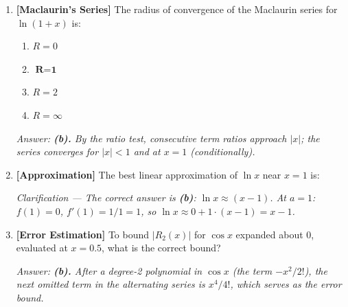 \documentclass[12pt,a4paper]{article}
\begin{document}
\begin{enumerate}[leftmargin=2em, label=\textbf{Q\arabic*.}]
\item \textbf{[Maclaurin's Series]} The radius of convergence of the Maclaurin series for
\(\ln(1+x)\) is:
\begin{enumerate}[label=(\alph*)]
  \item \(R = 0\)
  \item \(\textbf{R} = \textbf{1}\)
  \item \(R = 2\)
  \item \(R = \infty\)
\end{enumerate}
\textit{Answer: \textbf{(b).} By the ratio test, consecutive term ratios approach
\(|x|\); the series converges for \(|x| < 1\) and at \(x=1\) (conditionally).}

\item \textbf{[Approximation]} The best linear approximation of \(\ln x\) near \(x = 1\) is:
\textit{Clarification --- The correct answer is \textbf{(b)}: \(\ln x \approx (x-1)\).
At \(a=1\): \(f(1)=0\), \(f'(1) = 1/1 = 1\), so \(\ln x \approx 0 + 1 \cdot (x-1) = x-1\).}

\item \textbf{[Error Estimation]} To bound \(|R_2(x)|\) for \(\cos x\) expanded about \(0\),
evaluated at \(x = 0.5\), what is the correct bound?
\textit{Answer: \textbf{(b).} After a degree-2 polynomial in \(\cos x\)
(the term \(-x^2/2!\)), the next omitted term in the alternating series is
\(x^4/4!\), which serves as the error bound.}


\end{enumerate}
\end{document}

